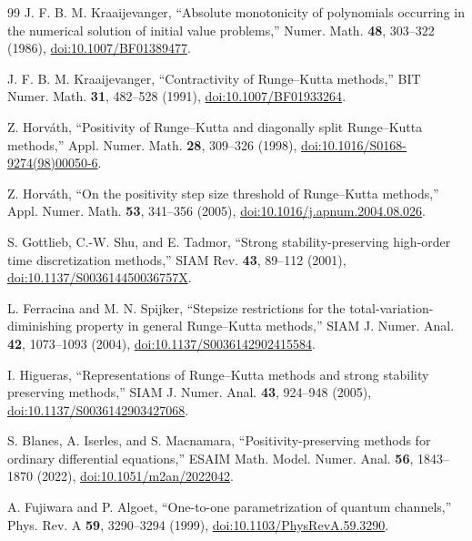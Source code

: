 \begin{thebibliography}{99}
J. F. B. M. Kraaijevanger, ``Absolute monotonicity of polynomials occurring in the numerical solution of initial value problems,'' Numer. Math. \textbf{48}, 303--322 (1986), \href{https://doi.org/10.1007/BF01389477}{doi:10.1007/BF01389477}.

J. F. B. M. Kraaijevanger, ``Contractivity of Runge--Kutta methods,'' BIT Numer. Math. \textbf{31}, 482--528 (1991), \href{https://doi.org/10.1007/BF01933264}{doi:10.1007/BF01933264}.

Z. Horv\'ath, ``Positivity of Runge--Kutta and diagonally split Runge--Kutta methods,'' Appl. Numer. Math. \textbf{28}, 309--326 (1998), \href{https://doi.org/10.1016/S0168-9274(98)00050-6}{doi:10.1016/S0168-9274(98)00050-6}.

Z. Horv\'ath, ``On the positivity step size threshold of Runge--Kutta methods,'' Appl. Numer. Math. \textbf{53}, 341--356 (2005), \href{https://doi.org/10.1016/j.apnum.2004.08.026}{doi:10.1016/j.apnum.2004.08.026}.

S. Gottlieb, C.-W. Shu, and E. Tadmor, ``Strong stability-preserving high-order time discretization methods,'' SIAM Rev. \textbf{43}, 89--112 (2001), \href{https://doi.org/10.1137/S003614450036757X}{doi:10.1137/S003614450036757X}.

L. Ferracina and M. N. Spijker, ``Stepsize restrictions for the total-variation-diminishing property in general Runge--Kutta methods,'' SIAM J. Numer. Anal. \textbf{42}, 1073--1093 (2004), \href{https://doi.org/10.1137/S0036142902415584}{doi:10.1137/S0036142902415584}.

I. Higueras, ``Representations of Runge--Kutta methods and strong stability preserving methods,'' SIAM J. Numer. Anal. \textbf{43}, 924--948 (2005), \href{https://doi.org/10.1137/S0036142903427068}{doi:10.1137/S0036142903427068}.

S. Blanes, A. Iserles, and S. Macnamara, ``Positivity-preserving methods for ordinary differential equations,'' ESAIM Math. Model. Numer. Anal. \textbf{56}, 1843--1870 (2022), \href{https://doi.org/10.1051/m2an/2022042}{doi:10.1051/m2an/2022042}.

A. Fujiwara and P. Algoet, ``One-to-one parametrization of quantum channels,'' Phys. Rev. A \textbf{59}, 3290--3294 (1999), \href{https://doi.org/10.1103/PhysRevA.59.3290}{doi:10.1103/PhysRevA.59.3290}.


\end{thebibliography}
